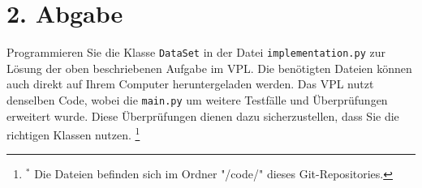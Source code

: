 \documentclass[]{article}
\begin{document}
\section{2. Abgabe}
Programmieren Sie die Klasse \texttt{DataSet} in der Datei \texttt{implementation.py} zur Lösung der oben beschriebenen Aufgabe im VPL. Die benötigten Dateien können auch direkt auf Ihrem Computer heruntergeladen werden. Das VPL nutzt denselben Code, wobei die \texttt{main.py} um weitere Testfälle und Überprüfungen erweitert wurde. Diese Überprüfungen dienen dazu sicherzustellen, dass Sie die richtigen Klassen nutzen. 
\footnote{$^{*}$ Die Dateien befinden sich im Ordner "/code/" dieses Git-Repositories.}
\end{document}
